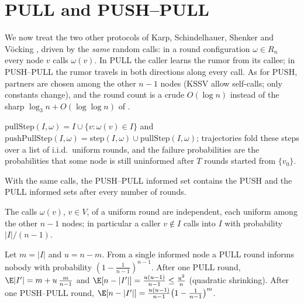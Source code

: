 \section{PULL and PUSH--PULL}\label{sec:pull}

We now treat the two other protocols of Karp, Schindelhauer, Shenker and
V\"ocking \cite{KSSV00}, driven by the \emph{same} random calls: in a round
configuration $\omega \in R_n$ every node $v$ calls $\omega(v)$. In PULL the
caller learns the rumor from its callee; in PUSH--PULL the rumor travels in
both directions along every call. As for PUSH, partners are chosen among the
other $n-1$ nodes (KSSV allow self-calls; only constants change), and the
round count is a crude $O(\log n)$ instead of the sharp
$\log_3 n + O(\log\log n)$ of \cite[Thm.~2.1]{KSSV00}.

\begin{definition}\label{def:pull}
  \leanok
  $\mathrm{pullStep}(I,\omega) = I \cup \{v : \omega(v) \in I\}$ and
  $\mathrm{pushPullStep}(I,\omega) = \mathrm{step}(I,\omega) \cup
  \mathrm{pullStep}(I,\omega)$; trajectories fold these steps over a list of
  i.i.d.\ uniform rounds, and the failure probabilities are the
  probabilities that some node is still uninformed after $T$ rounds started
  from $\{v_0\}$.
\end{definition}

\begin{lemma}\label{lem:pull-domination}
  \leanok
  With the same calls, the PUSH--PULL informed set contains the PUSH and the
  PULL informed sets after every number of rounds.
\end{lemma}

\begin{lemma}\label{lem:pull-indep}
  \leanok
  The calls $\omega(v)$, $v \in V$, of a uniform round are independent, each
  uniform among the other $n-1$ nodes; in particular a caller $v \notin I$
  calls into $I$ with probability $|I|/(n-1)$.
\end{lemma}

\begin{lemma}\label{lem:pull-oneround}
  \leanok
  Let $m = |I|$ and $u = n - m$. From a single informed node a PULL round
  informs nobody with probability $(1 - \frac1{n-1})^{n-1}$. After one PULL
  round, $\E|I'| = m + u\,\frac{m}{n-1}$ and
  $\E[n - |I'|] = \frac{u(u-1)}{n-1} \le \frac{u^2}{n}$ (quadratic
  shrinking). After one PUSH--PULL round,
  $\E[n - |I'|] = \frac{u(u-1)}{n-1}\bigl(1 - \frac1{n-1}\bigr)^{m}$.
\end{lemma}

